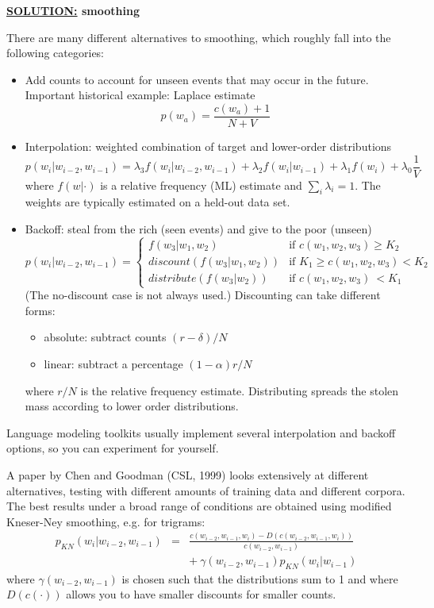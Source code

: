 \documentclass[11pt,titlepage]{article}
\begin{document}
\clearpage


{\bf \underline{SOLUTION:} smoothing}

There are many different alternatives to smoothing, which roughly fall
into the following categories:
\begin{itemize}
\item Add counts to account for unseen events that may occur in the future.
Important historical example: Laplace estimate 
$$p(w_a) = \frac{c(w_a) + 1}{N+V}$$
\item Interpolation: weighted combination of target and lower-order distributions
$$p(w_i|w_{i-2},w_{i-1}) = \lambda_3 f(w_i|w_{i-2},w_{i-1})
 + \lambda_2 f(w_i|w_{i-1})  + \lambda_1 f(w_i) + \lambda_0 \frac{1}{V}$$
where $f(w|\cdot)$ is a relative frequency (ML) estimate and $\sum_i \lambda_i = 1$.
The weights are typically estimated on a held-out data set.
\item Backoff: steal from the rich (seen events) and give to the poor (unseen)
{\Large
$$p(w_i|w_{i-2},w_{i-1}) = \left\{
\begin{array}{ll}
f(w_3|w_1,w_2) & \mbox{if } c(w_1,w_2, w_3)\ge K_2\\
discount(f(w_3|w_1,w_2)) & \mbox{if } K_1 \ge c(w_1,w_2, w_3) < K_2\\
distribute(f(w_3|w_2)) & \mbox{if } c(w_1,w_2, w_3)\ < K_1
\end{array}\right.  $$
}
(The no-discount case is not always used.)
Discounting can take different forms:
\begin{itemize}
\item absolute: subtract counts $(r-\delta)/N$
\item linear: subtract a percentage $(1-\alpha)r/N$
\end{itemize}
where $r/N$ is the relative frequency estimate. Distributing spreads the
stolen mass according to lower order distributions.
\end{itemize}

Language modeling toolkits usually implement several interpolation and
backoff options, so you can experiment for yourself. 

\clearpage

A paper by Chen and Goodman (CSL, 1999) looks extensively at different alternatives,
testing with different amounts of training data and different corpora.  The best
results under a broad range of conditions are obtained using modified
Kneser-Ney smoothing, e.g. for trigrams:
\begin{eqnarray*}
p_{KN}(w_i|w_{i-2},w_{i-1}) & = & \frac{c(w_{i-2},w_{i-1},w_i) - D(c(w_{i-2},w_{i-1},w_i))}{c(w_{i-2},w_{i-1})} \\
 & & + \ \gamma(w_{i-2},w_{i-1})p_{KN}(w_i|w_{i-1})
\end{eqnarray*}
where $\gamma(w_{i-2},w_{i-1})$ is chosen such that the distributions sum to 1
and where $D(c(\cdot))$ allows you to have smaller discounts for smaller
counts.
\end{document}
